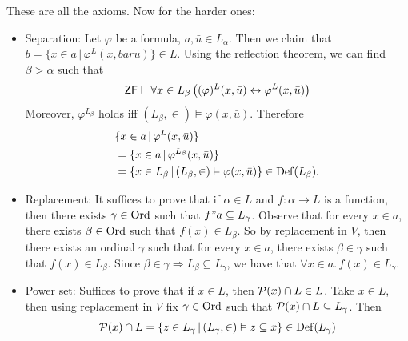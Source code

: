 \documentclass{article}
\begin{document}
These are all the  axioms. Now for the harder ones: \begin{itemize}
    \item Separation: Let $\varphi$ be a formula, $a, \bar{u} \in L_{\alpha}$. Then we claim that $b= \{ x \in a \, | \, \varphi^{L}(x,bar{u})\} \in L$. Using the reflection theorem, we can find $\beta > \alpha$ such that \[ \mathsf{ZF} \vdash \forall x \in L_{\beta} \left( (\varphi)^{L}(x, \bar{u}) \leftrightarrow \varphi^{L}(x, \bar{u})\right)\] Moreover, $\varphi^{L_{\beta}}$ holds iff $(L_{\beta},\in) \models \varphi(x, \bar{u})$. Therefore \begin{align*}
               & \{x \in a \, | \, \varphi^{L}(x, \bar{u})\}                                                        \\
               & = \{x \in a \, | \, \varphi^{L_{\beta}}(x, \bar{u})\}                                              \\
               & = \{ x \in L_{\beta} \, | \, (L_{\beta} , \in) \vDash \varphi(x, \bar{u}) \} \in \operatorname{Def}(L_{\beta}).
          \end{align*}
    \item Replacement: It suffices to prove that if $\alpha \in L$ and $f: \alpha \to L$ is a function, then there exists $\gamma \in \operatorname{Ord}$ such that $f"a \subseteq L_{\gamma}$. Observe that for every $x \in a$, there exists $\beta \in \operatorname{Ord}$ such that $f(x) \in L_{\beta}$. So by replacement in $V$, then there exists an ordinal $\gamma$ such that for every $x \in a$, there exists $\beta \in \gamma$ such that $f(x) \in L_{\beta}$. Since $\beta \in \gamma \Rightarrow L_{\beta} \subseteq L_{\gamma}$, we have that $\forall x \in a. \, f(x) \in L_{\gamma}$.
    \item Power set: Suffices to prove that if $x \in L$, then $\mathcal{P}(x) \cap L \in L$. Take $x \in L$, then using replacement in $V$ fix $\gamma \in \operatorname{Ord}$ such that $\mathcal{P}(x) \cap L \subseteq L_{\gamma}$. Then \[\mathcal{P}(x) \cap L = \{ z \in L_{\gamma} \, | \, (L_{\gamma}, \in) \vDash z \subseteq x \} \in \operatorname{Def}(L_{\gamma})\]
\end{itemize}
\endproof
\end{document}

